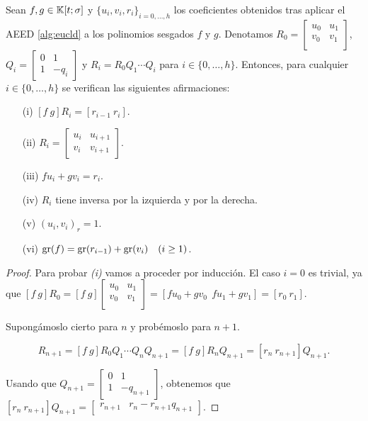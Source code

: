 \begin{lema}\label{lema:24}
Sean $f,g \in \mathbb{K}[t;\sigma]$ y $\{u_i,v_i,r_i\}_{i=0,\dots,h}$ los coeficientes obtenidos tras aplicar el AEED \ref{alg:eucld} a los polinomios sesgados $f$ y $g$. Denotamos $R_0 = \begin{bmatrix}
u_0 & u_1 \\
v_0 & v_1 \\ 
\end{bmatrix}$, $Q_i = \begin{bmatrix}
    0 & 1 \\
    1 & -q_i
\end{bmatrix}$ y $R_i = R_0Q_1\cdots Q_i$ para $i \in \{0,\dots,h\}$. Entonces, para cualquier  $i \in \{0,\dots,h\}$ se verifican las siguientes afirmaciones:

\begin{itemize}
    \item[(i)] $[f \ g]R_i = [r_{i-1} \ r_i]$.
    \item[(ii)] $R_i = \begin{bmatrix}
        u_i & u_{i+1} \\
        v_i & v_{i+1}
    \end{bmatrix}$. 
    \item[(iii)] $fu_i + gv_i = r_i$.
    \item[(iv)] $R_i$ tiene inversa por la izquierda y por la derecha.
    \item[(v)] $(u_i,v_i)_r = 1$.
    \item[(vi)] $\operatorname{gr}(f) = \operatorname{gr}(r_{i-1}) + \operatorname{gr}(v_i) \quad (i \geq 1)$. 
\end{itemize}

\begin{proof}
Para probar \textit{(i)} vamos a proceder por inducción. El caso $i = 0$ es trivial, ya que  $[f \ g]R_0 = [f \ g]\begin{bmatrix}
    u_0 & u_1 \\
    v_0 & v_1 \\ 
    \end{bmatrix} = [fu_0 + gv_0 \ \ fu_1 + gv_1] = [r_0 \ r_1].$

Supongámoslo cierto para $n$ y probémoslo para $n+1$.

\begin{equation}
[f \ g]R_{n+1} = [f \ g]R_0Q_1\cdots Q_nQ_{n+1} = [f \ g]R_nQ_{n+1} = [r_n \ r_{n+1}]Q_{n+1}.
\end{equation}

Usando que $Q_{n+1} = \begin{bmatrix}
    0 & 1 \\
    1 & -q_{n+1}
\end{bmatrix}$, obtenemos que $[r_n \ r_{n+1}]Q_{n+1} = \begin{bmatrix}
    r_{n+1} & r_n - r_{n+1}q_{n+1} 
\end{bmatrix}$.


\end{proof}
\end{lema}
